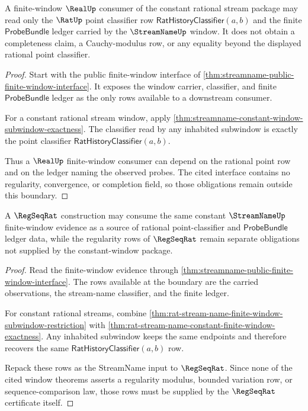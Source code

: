 \begin{theorem}
\label{thm:streamname-constant-window-real-boundary}
A finite-window $\RealUp$ consumer of the constant rational stream package may
read only the $\RatUp$ point classifier row
$\mathsf{RatHistoryClassifier}(a,b)$ and the finite $\mathsf{ProbeBundle}$ ledger
carried by the $\StreamNameUp$ window. It does not obtain a completeness
claim, a Cauchy-modulus row, or any equality beyond the displayed rational
point classifier.
\end{theorem}
\begin{proof}
Start with the public finite-window interface of
\autoref{thm:streamname-public-finite-window-interface}. It exposes the
window carrier, classifier, and finite $\mathsf{ProbeBundle}$ ledger as the only rows
available to a downstream consumer.

For a constant rational stream window, apply
\autoref{thm:streamname-constant-window-subwindow-exactness}. The classifier
read by any inhabited subwindow is exactly the point classifier
$\mathsf{RatHistoryClassifier}(a,b)$.

Thus a $\RealUp$ finite-window consumer can depend on the rational point row
and on the ledger naming the observed probes. The cited interface contains no
regularity, convergence, or completion field, so those obligations remain
outside this boundary.
\end{proof}

\begin{theorem}
\label{thm:streamname-constant-window-regseq-boundary}
A $\RegSeqRat$ construction may consume the same constant $\StreamNameUp$
finite-window evidence as a source of rational point-classifier and
$\mathsf{ProbeBundle}$ ledger data, while the regularity rows of $\RegSeqRat$ remain
separate obligations not supplied by the constant-window package.
\end{theorem}
\begin{proof}
Read the finite-window evidence through
\autoref{thm:streamname-public-finite-window-interface}. The rows available at
the boundary are the carried observations, the stream-name classifier, and the
finite ledger.

For constant rational streams, combine
\autoref{thm:rat-stream-name-finite-window-subwindow-restriction} with
\autoref{thm:rat-stream-name-constant-finite-window-exactness}. Any inhabited
subwindow keeps the same endpoints and therefore recovers the same
$\mathsf{RatHistoryClassifier}(a,b)$ row.

Repack these rows as the StreamName input to $\RegSeqRat$. Since none of the
cited window theorems asserts a regularity modulus, bounded variation row, or
sequence-comparison law, those rows must be supplied by the $\RegSeqRat$
certificate itself.
\end{proof}

